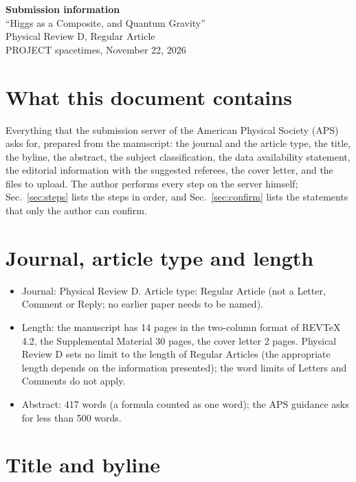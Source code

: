 \documentclass[11pt]{article}
\begin{document}
\begin{center}
{\Large\bf Submission information}\\[4pt]
{\large ``Higgs as a Composite, and Quantum Gravity''}\\[2pt]
Physical Review D, Regular Article\\[2pt]
PROJECT spacetimes, November 22, 2026
\end{center}

\section{What this document contains}

Everything that the submission server of the American Physical Society (APS) asks for, prepared from the manuscript: the
journal and the article type, the title, the byline, the abstract, the subject classification, the data availability
statement, the editorial information with the suggested referees, the cover letter, and the files to upload. The author
performs every step on the server himself; Sec.~\ref{sec:steps} lists the steps in order, and Sec.~\ref{sec:confirm} lists
the statements that only the author can confirm.

\section{Journal, article type and length}

\begin{itemize}
\item Journal: Physical Review D. Article type: Regular Article (not a Letter, Comment or Reply; no earlier paper needs to be
named).
\item Length: the manuscript has 14 pages in the two-column format of REVTeX 4.2, the Supplemental Material
30 pages, the cover letter 2 pages. Physical Review D sets no limit to the length of Regular Articles
(the appropriate length depends on the information presented); the word limits of Letters and Comments do not apply.
\item Abstract: 417 words (a formula counted as one word); the APS guidance asks for less than 500 words.
\end{itemize}

\section{Title and byline}
\label{sec:title}
\end{document}
